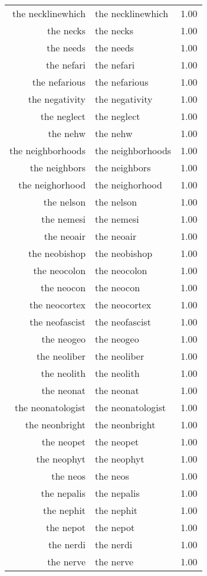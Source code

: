 \begin{table}[ht]
\begin{tabular}{rlr}
  the necklinewhich & the necklinewhich & 1.00 \\ 
  the necks & the necks & 1.00 \\ 
  the needs & the needs & 1.00 \\ 
  the nefari & the nefari & 1.00 \\ 
  the nefarious & the nefarious & 1.00 \\ 
  the negativity & the negativity & 1.00 \\ 
  the neglect & the neglect & 1.00 \\ 
  the nehw & the nehw & 1.00 \\ 
  the neighborhoods & the neighborhoods & 1.00 \\ 
  the neighbors & the neighbors & 1.00 \\ 
  the neighorhood & the neighorhood & 1.00 \\ 
  the nelson & the nelson & 1.00 \\ 
  the nemesi & the nemesi & 1.00 \\ 
  the neoair & the neoair & 1.00 \\ 
  the neobishop & the neobishop & 1.00 \\ 
  the neocolon & the neocolon & 1.00 \\ 
  the neocon & the neocon & 1.00 \\ 
  the neocortex & the neocortex & 1.00 \\ 
  the neofascist & the neofascist & 1.00 \\ 
  the neogeo & the neogeo & 1.00 \\ 
  the neoliber & the neoliber & 1.00 \\ 
  the neolith & the neolith & 1.00 \\ 
  the neonat & the neonat & 1.00 \\ 
  the neonatologist & the neonatologist & 1.00 \\ 
  the neonbright & the neonbright & 1.00 \\ 
  the neopet & the neopet & 1.00 \\ 
  the neophyt & the neophyt & 1.00 \\ 
  the neos & the neos & 1.00 \\ 
  the nepalis & the nepalis & 1.00 \\ 
  the nephit & the nephit & 1.00 \\ 
  the nepot & the nepot & 1.00 \\ 
  the nerdi & the nerdi & 1.00 \\ 
  the nerve & the nerve & 1.00 \\ 

\end{tabular}
\end{table}
